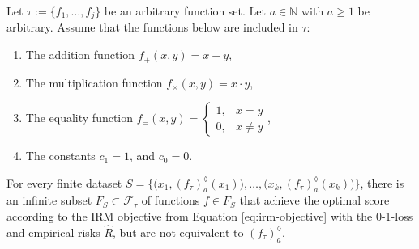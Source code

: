 \begin{lemma}
	\label{lemma:recursive-completion-irm-cannot-identify}
	Let $\tau:=\{f_1,\dots,f_j\}$ be an arbitrary function set.
	Let $a\in\mathbb{N}$ with $a\geq 1$ be arbitrary.
	Assume that the functions below are included in $\tau$:
	\begin{enumerate}
		\item The addition function $f_{+}(x,y)=x+y$,
		\item The multiplication function $f_{\times}(x,y)=x\cdot y$,
		\item The equality function $f_{=}(x,y)=\begin{cases}
			1, & x=y\\
			0, & x\neq y
		\end{cases}$,
		\item The constants $c_1=1$, and $c_0=0$.
	\end{enumerate}
	
	For every finite dataset $S=\bigl\{\bigl(x_1,\left(f_{\tau}\right)_a^{\lozenge}(x_1)\bigr),\dots,\bigl(x_k,\left(f_{\tau}\right)_a^{\lozenge}(x_k)\bigr)\bigr\}$, there is an infinite subset $F_S\subset \mathcal{F}_{\tau}$ of functions $f\in F_S$ that achieve the optimal score according to the IRM objective from Equation \ref{eq:irm-objective} with the 0-1-loss and empirical risks $\hat{R}$, but are not equivalent to $\left(f_{\tau}\right)_a^{\lozenge}$.
\end{lemma}
